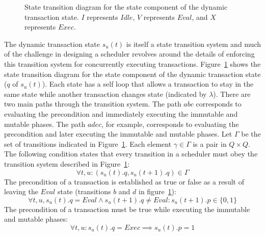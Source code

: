 \begin{figure}
\centering
\begingroup
\fontsize{10pt}{12pt}\selectfont
{}
\endgroup
\caption{State transition diagram for the state component of the dynamic transaction state.
  $I$ represents $\mathit{Idle}$, $V$ represents $\mathit{Eval}$, and $X$ represents $\mathit{Exec}$.
  \label{dt_state}}
\end{figure}

The dynamic transaction state $s_u(t)$ is itself a state transition system and much of the challenge in designing a scheduler revolves around the details of enforcing this transition system for concurrently executing transactions.
Figure~\ref{dt_state} shows the state transition diagram for the state component of the dynamic transaction state ($q$ of $s_u(t)$).
Each state has a self loop that allows a transaction to stay in the same state while another transaction changes state (indicated by $\lambda$).
There are two main paths through the transition system.
The path $abc$ corresponds to evaluating the precondition and immediately executing the immutable and mutable phases.
The path $adec$, for example, corresponds to evaluating the precondition and later executing the immutable and mutable phases.
Let $\Gamma$ be the set of transitions indicated in Figure~\ref{dt_state}.
Each element $\gamma \in \Gamma$ is a pair in $Q \times Q$.
The following condition states that every transition in a scheduler must obey the transition system described in Figure~\ref{dt_state}:
\begin{equation}
  \forall t, u : (s_u(t).q, s_u(t+1).q) \in \Gamma
\end{equation}
The precondition of a transaction is established as true or false as a result of leaving the $\mathit{Eval}$ state (transitions $b$ and $d$ in figure~\ref{dt_state}):
\begin{equation}
  \label{pre_establish}
  \forall t, u, s_u(t).q = \mathit{Eval} \land s_u(t+1).q \neq \mathit{Eval} : s_u(t+1).p \in \{0,1\}
\end{equation}
The precondition of a transaction must be true while executing the immutable and mutable phases:
\begin{equation}
  \label{pre_true}
  \forall t, u : s_u(t).q = \mathit{Exec} \implies s_u(t).p = 1
\end{equation}

